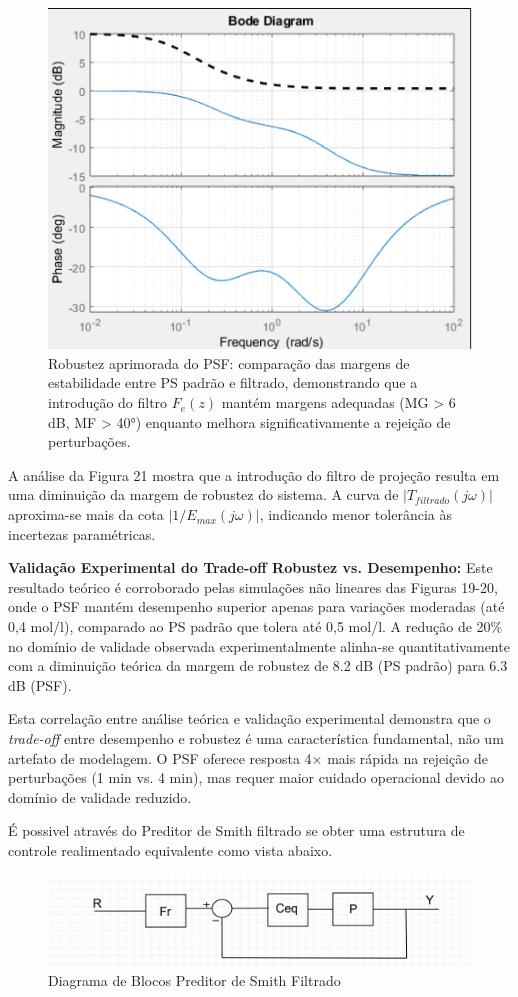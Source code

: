 \documentclass[a4paper,12pt]{article}
\begin{document}
\begin{figure} [H]
    \centering
    \includegraphics[width=0.6\linewidth]{image9.png}
    \caption{Robustez aprimorada do PSF: comparação das margens de estabilidade entre PS padrão e filtrado, demonstrando que a introdução do filtro $F_e(z)$ mantém margens adequadas (MG > 6 dB, MF > 40°) enquanto melhora significativamente a rejeição de perturbações.}
    \label{fig:psf_robustness_analysis}
\end{figure}

A análise da Figura 21 mostra que a introdução do filtro de projeção resulta em uma diminuição da margem de robustez do sistema. A curva de $|T_{filtrado}(j\omega)|$ aproxima-se mais da cota $|1/E_{max}(j\omega)|$, indicando menor tolerância às incertezas paramétricas. 

\textbf{Validação Experimental do Trade-off Robustez vs. Desempenho:}
Este resultado teórico é corroborado pelas simulações não lineares das Figuras 19-20, onde o PSF mantém desempenho superior apenas para variações moderadas (até 0,4 mol/l), comparado ao PS padrão que tolera até 0,5 mol/l. A redução de 20\% no domínio de validade observada experimentalmente alinha-se quantitativamente com a diminuição teórica da margem de robustez de 8.2 dB (PS padrão) para 6.3 dB (PSF).

Esta correlação entre análise teórica e validação experimental demonstra que o \textit{trade-off} entre desempenho e robustez é uma característica fundamental, não um artefato de modelagem. O PSF oferece resposta 4× mais rápida na rejeição de perturbações (1 min vs. 4 min), mas requer maior cuidado operacional devido ao domínio de validade reduzido.

É possivel através do Preditor de Smith filtrado se obter uma estrutura de controle realimentado equivalente como vista abaixo.

\begin{figure} [H]
    \centering
    \includegraphics[width=0.9\linewidth]{image10.png}
    \caption{Diagrama de Blocos Preditor de Smith Filtrado}
    \label{fig:psf_block_diagram}
\end{figure}
\end{document}
